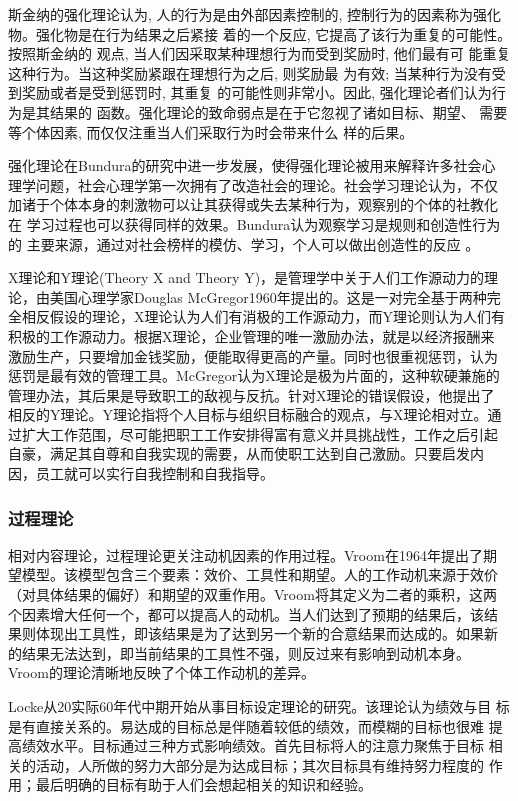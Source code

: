 \documentclass[12pt,a4paper,cs4size]{ctexart}
\begin{document}
斯金纳的强化理论认为, 人的行为是由外部因素控制的,
控制行为的因素称为强化物。强化物是在行为结果之后紧接
着的一个反应, 它提高了该行为重复的可能性。按照斯金纳的
观点, 当人们因采取某种理想行为而受到奖励时, 他们最有可
能重复这种行为。当这种奖励紧跟在理想行为之后, 则奖励最
为有效; 当某种行为没有受到奖励或者是受到惩罚时, 其重复
的可能性则非常小。因此, 强化理论者们认为行为是其结果的
函数\cite{skinner1938boe}\cite{ferster1957sr}。强化理论的致命弱点是在于它忽视了诸如目标、期望、
需要等个体因素, 而仅仅注重当人们采取行为时会带来什么
样的后果。

强化理论在Bundura的研究中进一步发展，使得强化理论被用来解释许多社会心
理学问题，社会心理学第一次拥有了改造社会的理论。社会学习理论认为，不仅
加诸于个体本身的刺激物可以让其获得或失去某种行为，观察别的个体的社教化
在
学习过程也可以获得同样的效果。Bundura认为观察学习是规则和创造性行为的
主要来源，通过对社会榜样的模仿、学习，个人可以做出创造性的反应
\cite{bundura1977slt}。

X理论和Y理论(Theory X and Theory Y)，是管理学中关于人们工作源动力的理
论，由美国心理学家Douglas McGregor1960年提出的。这是一对完全基于两种完
全相反假设的理论，X理论认为人们有消极的工作源动力，而Y理论则认为人们有
积极的工作源动力。根据X理论，企业管理的唯一激励办法，就是以经济报酬来
激励生产，只要增加金钱奖励，便能取得更高的产量。同时也很重视惩罚，认为
惩罚是最有效的管理工具。McGregor认为X理论是极为片面的，这种软硬兼施的
管理办法，其后果是导致职工的敌视与反抗。针对X理论的错误假设，他提出了
相反的Y理论。Y理论指将个人目标与组织目标融合的观点，与X理论相对立。通
过扩大工作范围，尽可能把职工工作安排得富有意义并具挑战性，工作之后引起
自豪，满足其自尊和自我实现的需要，从而使职工达到自己激励。只要启发内
因，员工就可以实行自我控制和自我指导\cite{mcgregor2006hse}。

\subsubsection{过程理论}
相对内容理论，过程理论更关注动机因素的作用过程。Vroom在1964年提出了期
望模型。该模型包含三个要素：效价、工具性和期望。人的工作动机来源于效价
（对具体结果的偏好）和期望的双重作用。Vroom将其定义为二者的乘积，这两
个因素增大任何一个，都可以提高人的动机。当人们达到了预期的结果后，该结
果则体现出工具性，即该结果是为了达到另一个新的合意结果而达成的。如果新
的结果无法达到，即当前结果的工具性不强，则反过来有影响到动机本身\cite{vroom1964wam}。
Vroom的理论清晰地反映了个体工作动机的差异。

Locke从20实际60年代中期开始从事目标设定理论的研究。该理论认为绩效与目
标是有直接关系的。易达成的目标总是伴随着较低的绩效，而模糊的目标也很难
提高绩效水平。目标通过三种方式影响绩效。首先目标将人的注意力聚焦于目标
相关的活动，人所做的努力大部分是为达成目标；其次目标具有维持努力程度的
作用；最后明确的目标有助于人们会想起相关的知识和经验\cite{locke1990tgs}。
\end{document}
